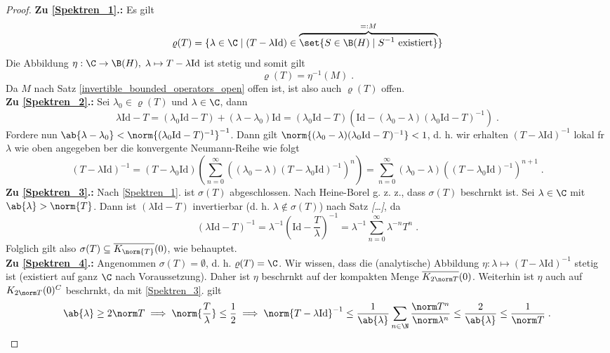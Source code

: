 	\begin{proof}
		\textbf{Zu \ref{Spektren_1}.:} Es gilt
		\[\varrho(T) = \{\lambda \in \C\;\vert\; (T-\lambda \text{Id}) \in \overbrace{\set{S \in \B(H)\;\vert\;S^{-1} \text{ existiert}}}^{=:M}\} \]
		Die Abbildung \(\eta:\C \to \B(H),\; \lambda \mapsto T-\lambda \text{Id}\) ist stetig und somit gilt 
		\[\varrho(T) = \eta^{-1}(M)\;.\]
		Da $M$ nach Satz \ref{invertible_bounded_operators_open} offen ist, ist also auch \(\varrho(T)\) offen.\\
		\textbf{Zu \ref{Spektren_2}.:} Sei \(\lambda_0 \in \varrho(T)\) und \(\lambda \in \C\), dann  
		\[\lambda\text{Id} - T = (\lambda_0\text{Id} -T) + (\lambda - \lambda_0)\text{Id} = (\lambda_0\text{Id}-T)(\text{Id} - (\lambda_0 - \lambda)(\lambda_0 \text{Id}-T)^{-1})\;.\]
		Fordere nun  \(\ab{\lambda - \lambda_0} < \norm{(\lambda_0\text{Id} -T)^{-1}}^{-1}\). Dann gilt \(\norm{(\lambda_0 - \lambda)(\lambda_0\text{Id}-T)^{-1}}< 1\), d. h. wir erhalten \((T-\lambda\text{Id})^{-1}\)  lokal f\us r \(\lambda\) wie oben angegeben \us ber die konvergente Neumann-Reihe wie folgt
		\[(T-\lambda\text{Id})^{-1} = (T-\lambda_0\text{Id})\left(\sum_{n=0}^\infty ((\lambda_0 - \lambda)(T-\lambda_0 \text{Id} )^{-1})^n\right) = \sum_{n=0}^\infty (\lambda_0 - \lambda)((T-\lambda_0 \text{Id} )^{-1})^{n+1}\;.\]
		\textbf{Zu \ref{Spektren_3}.:} Nach \ref{Spektren_1}. ist \(\sigma(T)\) abgeschlossen. Nach Heine-Borel g. z. z., dass \(\sigma(T)\) beschr\as nkt ist. Sei \(\lambda \in \C\) mit \(\ab{\lambda} > \norm{T}\). Dann ist \((\lambda \text{Id} - T)\) invertierbar (d. h. \(\lambda \not\in \sigma(T)\)) nach Satz \textit{[\ldots]}, da
		\[(\lambda\text{Id} - T)^{-1} = \lambda^{-1} \left(\text{Id} -\frac{T}{\lambda}\right)^{-1} = \lambda^{-1} \sum_{n=0}^\infty \lambda^{-n} T^n\;.\]
		Folglich gilt also \(\sigma(T)\subseteq \overline{K_{\norm{T}}}(0)\), wie behauptet. \\
		\textbf{Zu \ref{Spektren_4}.:} Angenommen \(\sigma(T) = \emptyset\), d. h. \(\varrho(T) = \C\). Wir wissen, dass die (analytische) Abbildung \(\eta: \lambda \mapsto (T - \lambda\text{Id})^{-1}\) stetig ist (existiert auf ganz $\C$ nach Voraussetzung). Daher ist $\eta$ beschr\as nkt auf der kompakten Menge \(\overline{K_{2\norm T}}(0)\). Weiterhin ist $\eta$ auch auf \(K_{2\norm T}(0)^C\) beschr\as nkt, da mit \ref{Spektren_3}. gilt 
		\[\ab{\lambda} \geq 2 \norm T \implies \norm{\frac T \lambda} \leq \frac 12 \implies \norm{T-\lambda\text{Id}}^{-1} \leq \frac{1}{\ab{\lambda}}\sum_{n\in\N}\frac{\norm T^n}{\norm \lambda ^n} \leq \frac{2}{\ab{\lambda}} \leq\frac{1}{\norm T}\;. \] 

\end{proof}
